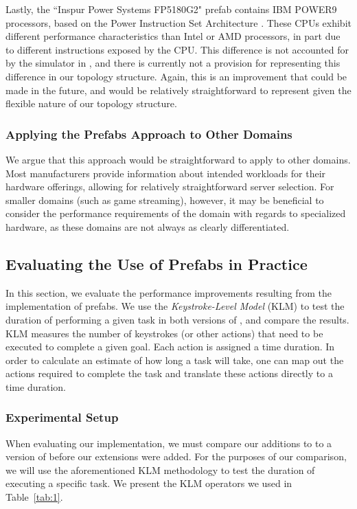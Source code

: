 \documentclass[11pt]{article}
\begin{document}
			Lastly, the ``Inspur Power Systems FP5180G2" prefab contains IBM POWER9 processors, based on the Power Instruction Set Architecture \cite{IBM2017}.
			These CPUs exhibit different performance characteristics than Intel or AMD processors, in part due to different instructions exposed by the CPU.
			This difference is not accounted for by the simulator in \opendc{}, and there is currently not a provision for representing this difference in our topology structure.
			Again, this is an improvement that could be made in the future, and would be relatively straightforward to represent given the flexible nature of our topology structure.


		\subsubsection{Applying the Prefabs Approach to Other Domains}
			We argue that this approach would be straightforward to apply to other domains.
			Most manufacturers provide information about intended workloads for their hardware offerings, allowing for relatively straightforward server selection.
			For smaller domains (such as game streaming), however, it may be beneficial to consider the performance requirements of the domain with regards to specialized hardware, as these domains are not always as clearly differentiated.

	\subsection{Evaluating the Use of Prefabs in Practice}
		In this section, we evaluate the performance improvements resulting from the implementation of prefabs.
		We use the \textit{Keystroke-Level Model} (KLM) \cite{Newell1980} to test the duration of performing a given task in both versions of \opendc{}, and compare the results.
		KLM measures the number of keystrokes (or other actions) that need to be executed to complete a given goal. 
		Each action is assigned a time duration.
		In order to calculate an estimate of how long a task will take, one can map out the actions required to complete the task and translate these actions directly to a time duration.

		\subsubsection{Experimental Setup}
			When evaluating our implementation, we must compare our additions to \opendc{} to a version of \opendc{} before our extensions were added.
			For the purposes of our comparison, we will use the aforementioned KLM methodology to test the duration of executing a specific task.
			We present the KLM operators we used in Table~\ref{tab:1}.
\end{document}
